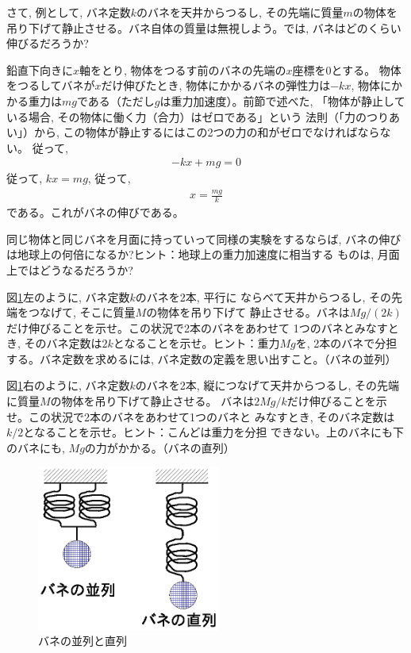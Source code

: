 さて, 例として, バネ定数$k$のバネを天井からつるし, その先端に質量$m$の物体を
吊り下げて静止させる。バネ自体の質量は無視しよう。では, バネはどのくらい
伸びるだろうか?

鉛直下向きに$x$軸をとり, 物体をつるす前のバネの先端の$x$座標を0とする。
物体をつるしてバネが$x$だけ伸びたとき, 物体にかかるバネの弾性力は$-kx$, 
物体にかかる重力は$mg$である（ただし$g$は重力加速度）。前節で述べた, 
「物体が静止している場合, その物体に働く力（合力）はゼロである」という
法則（「力のつりあい」）から, この物体が静止するにはこの2つの力の和がゼロでなければならない。
従って, 
\begin{eqnarray}
-kx+mg=0
\end{eqnarray}
従って, $kx=mg$, 従って, 
\begin{eqnarray}
x=\frac{mg}{k}\label{eq:x_mg_k}
\end{eqnarray}
である。これがバネの伸びである。


\begin{q}\label{q:spring_moon}
同じ物体と同じバネを月面に持っていって同様の実験をするならば, 
バネの伸びは地球上の何倍になるか?ヒント：地球上の重力加速度に相当する
ものは, 月面上ではどうなるだろうか?
\end{q}

\begin{q}\label{q:spring_double_parallel}
図\ref{fig:spring_serial}左のように, バネ定数$k$のバネを2本, 平行に
ならべて天井からつるし, その先端をつなげて, そこに質量$M$の物体を吊り下げて
静止させる。バネは$Mg/(2k)$だけ伸びることを示せ。この状況で2本のバネをあわせて
1つのバネとみなすとき, そのバネ定数は$2k$となることを示せ。ヒント：重力$Mg$を, 
2本のバネで分担する。バネ定数を求めるには, バネ定数の定義を思い出すこと。（バネの並列）
\end{q}

\begin{q}\label{q:spring_double_series}
図\ref{fig:spring_serial}右のように, バネ定数$k$のバネを2本, 
縦につなげて天井からつるし, その先端に質量$M$の物体を吊り下げて静止させる。
バネは$2Mg/k$だけ伸びることを示せ。この状況で2本のバネをあわせて1つのバネと
みなすとき, そのバネ定数は$k/2$となることを示せ。ヒント：こんどは重力を分担
できない。上のバネにも下のバネにも, $Mg$の力がかかる。（バネの直列）
\mv
\begin{figure}[h]
    \centering
    \includegraphics[width=6cm]{spring_serial.eps}
    \caption{バネの並列と直列}\label{fig:spring_serial}
\end{figure}
\end{q}

